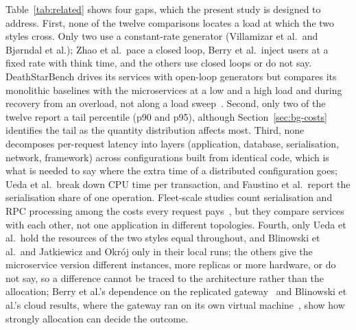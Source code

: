 Table~\ref{tab:related} shows four gaps, which the present study is designed to address. First, none of the
twelve comparisons locates a load at which the two styles cross. Only two use a constant-rate generator (Villamizar et al.\ and Bj{\o}rndal et al.); Zhao et al.\ pace a closed
loop, Berry et al.\ inject users at a fixed rate with think time, and the others use closed loops or do not say. DeathStarBench drives its
services with open-loop generators but compares its monolithic baselines with the microservices at a low and a
high load and during recovery from an overload, not along a load sweep~\cite{Gan2019}. Second, only two of the
twelve report a tail percentile (p90 and p95), although Section~\ref{sec:bg-costs} identifies the tail as the
quantity distribution affects most.
Third, none decomposes per-request latency into layers (application, database, serialisation, network,
framework) across configurations built from identical code, which is what is needed to say where the extra time
of a distributed configuration goes; Ueda et al.\ break down CPU time per transaction, and Faustino et al.\ report
the serialisation share of one operation. Fleet-scale studies
count serialisation and RPC processing among the costs every request pays~\cite{Kanev2015,Seemakhupt2023}, but
they compare services with each other, not one application in different topologies. Fourth, only Ueda et al.\ hold the resources of the two styles equal throughout, and Blinowski et al.\ and
Jatkiewicz and Okr\'oj only in their local runs; the others give the microservice version different instances, more replicas or more hardware, or do not
say, so a difference cannot be traced to the architecture rather than the allocation; Berry et al.'s
dependence on the replicated gateway~\cite{Berry2024} and Blinowski et al.'s cloud results, where
the gateway ran on its own virtual machine~\cite{Blinowski2022}, show how strongly allocation can
decide the outcome.
